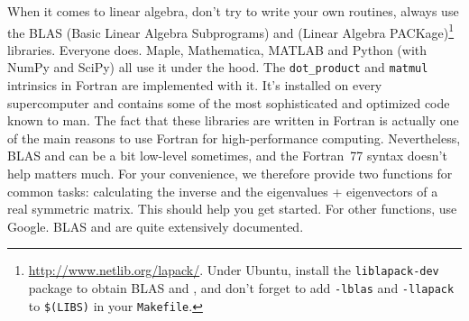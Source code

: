 \label{chap:Linear algebra}

When it comes to linear algebra, don't try to write your own routines, always use the BLAS (Basic Linear Algebra Subprograms) and  (Linear Algebra PACKage)\footnote{\url{http://www.netlib.org/lapack/}.
Under Ubuntu, install the \texttt{liblapack-dev} package to obtain BLAS and , and don't forget to add \texttt{-lblas} and \texttt{-llapack} to \texttt{\$(LIBS)} in your \texttt{Makefile}.} libraries.
Everyone does.
Maple, Mathematica, MATLAB and Python (with NumPy and SciPy) all use it under the hood.
The \texttt{dot\_product} and \texttt{matmul} intrinsics in Fortran are implemented with it.
It's installed on every supercomputer and contains some of the most sophisticated and optimized code known to man.
The fact that these libraries are written in Fortran is actually one of the main reasons to use Fortran for high-performance computing.
Nevertheless, BLAS and  can be a bit low-level sometimes, and the Fortran~77 syntax doesn't help matters much.
For your convenience, we therefore provide two functions for common tasks: calculating the inverse and the eigenvalues + eigenvectors of a real symmetric matrix.
This should help you get started.
For other functions, use Google.
BLAS and  are quite extensively documented.





